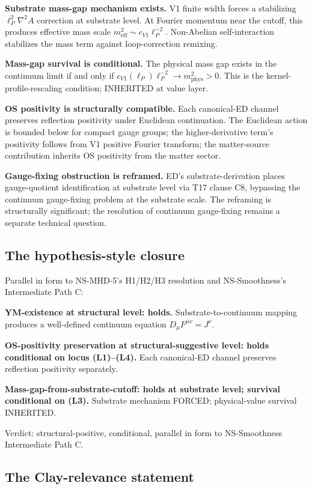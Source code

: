 \documentclass[11pt,a4paper]{article}
\begin{document}
\textbf{Substrate mass-gap mechanism exists.} V1 finite width forces a stabilizing $\ell_P^{2} \nabla^{2} A$ correction at substrate level. At Fourier momentum near the cutoff, this produces effective mass scale $m_\mathrm{eff}^{2} \sim c_{V1} \ell_P^{-2}$. Non-Abelian self-interaction stabilizes the mass term against loop-correction remixing.

\textbf{Mass-gap survival is conditional.} The physical mass gap exists in the continuum limit if and only if $c_{V1}(\ell_P) \ell_P^{-2} \to m_\mathrm{phys}^{2} > 0$. This is the kernel-profile-rescaling condition; INHERITED at value layer.

\textbf{OS positivity is structurally compatible.} Each canonical-ED channel preserves reflection positivity under Euclidean continuation. The Euclidean action is bounded below for compact gauge groups; the higher-derivative term's positivity follows from V1 positive Fourier transform; the matter-source contribution inherits OS positivity from the matter sector.

\textbf{Gauge-fixing obstruction is reframed.} ED's substrate-derivation places gauge-quotient identification at substrate level via T17 clause C8, bypassing the continuum gauge-fixing problem at the substrate scale. The reframing is structurally significant; the resolution of continuum gauge-fixing remains a separate technical question.

\subsection{The hypothesis-style closure}

Parallel in form to NS-MHD-5's H1/H2/H3 resolution and NS-Smoothness's Intermediate Path C:

\textbf{YM-existence at structural level: holds.} Substrate-to-continuum mapping produces a well-defined continuum equation $D_\mu F^{\mu\nu} = J^\nu$.

\textbf{OS-positivity preservation at structural-suggestive level: holds conditional on locus (L1)--(L4).} Each canonical-ED channel preserves reflection positivity separately.

\textbf{Mass-gap-from-substrate-cutoff: holds at substrate level; survival conditional on (L3).} Substrate mechanism FORCED; physical-value survival INHERITED.

Verdict: structural-positive, conditional, parallel in form to NS-Smoothness Intermediate Path C.

\subsection{The Clay-relevance statement}
\end{document}
